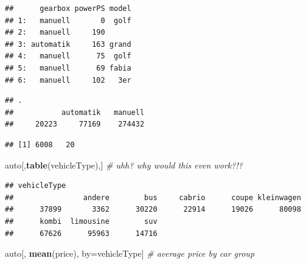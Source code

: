 \documentclass[]{book}
\newenvironment{Shaded}{\begin{snugshade}}{\end{snugshade}}
\newcommand{\KeywordTok}[1]{\textcolor[rgb]{0.13,0.29,0.53}{\textbf{#1}}}
\newcommand{\StringTok}[1]{\textcolor[rgb]{0.31,0.60,0.02}{#1}}
\newcommand{\CommentTok}[1]{\textcolor[rgb]{0.56,0.35,0.01}{\textit{#1}}}
\newcommand{\OperatorTok}[1]{\textcolor[rgb]{0.81,0.36,0.00}{\textbf{#1}}}
\newcommand{\NormalTok}[1]{#1}
\theoremstyle{definition}
\theoremstyle{definition}
\theoremstyle{definition}
\theoremstyle{remark}
\begin{document}
\begin{verbatim}
##      gearbox powerPS model
## 1:   manuell       0  golf
## 2:   manuell     190      
## 3: automatik     163 grand
## 4:   manuell      75  golf
## 5:   manuell      69 fabia
## 6:   manuell     102   3er
\end{verbatim}

\begin{Shaded}
\end{Shaded}

\begin{verbatim}
## .
##           automatik   manuell 
##     20223     77169    274432
\end{verbatim}

\begin{Shaded}
\end{Shaded}

\begin{verbatim}
## [1] 6008   20
\end{verbatim}

\begin{Shaded}
\begin{Highlighting}[]
\NormalTok{auto[,}\KeywordTok{table}\NormalTok{(vehicleType),] }\CommentTok{# uhh? why would this even work?!?}
\end{Highlighting}
\end{Shaded}

\begin{verbatim}
## vehicleType
##                andere        bus     cabrio      coupe kleinwagen 
##      37899       3362      30220      22914      19026      80098 
##      kombi  limousine        suv 
##      67626      95963      14716
\end{verbatim}

\begin{Shaded}
\begin{Highlighting}[]
\NormalTok{auto[, }\KeywordTok{mean}\NormalTok{(price), by=vehicleType] }\CommentTok{# average price by car group}
\end{Highlighting}
\end{Shaded}
\end{document}
